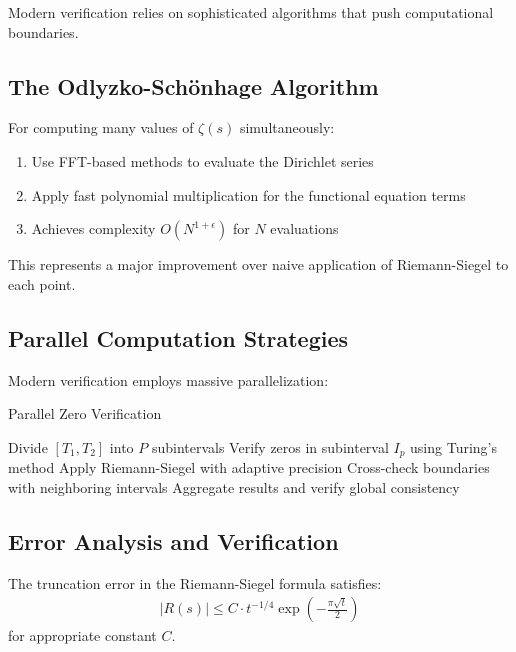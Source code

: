 Modern verification relies on sophisticated algorithms that push computational boundaries.

\subsection{The Odlyzko-Schönhage Algorithm}

\begin{theorem}
For computing many values of $\zeta(s)$ simultaneously:
\begin{enumerate}
\item Use FFT-based methods to evaluate the Dirichlet series
\item Apply fast polynomial multiplication for the functional equation terms
\item Achieves complexity $O(N^{1+\epsilon})$ for $N$ evaluations
\end{enumerate}
\end{theorem}

This represents a major improvement over naive application of Riemann-Siegel to each point.

\subsection{Parallel Computation Strategies}

Modern verification employs massive parallelization:

\begin{algorithm}[H]
\caption{Parallel Zero Verification}
\begin{algorithmic}
\State Divide $[T_1, T_2]$ into $P$ subintervals
    \State Verify zeros in subinterval $I_p$ using Turing's method
    \State Apply Riemann-Siegel with adaptive precision
    \State Cross-check boundaries with neighboring intervals
\EndFor
\State Aggregate results and verify global consistency
\end{algorithmic}
\end{algorithm}

\subsection{Error Analysis and Verification}

\begin{theorem}
The truncation error in the Riemann-Siegel formula satisfies:
\begin{align}
|R(s)| \leq C \cdot t^{-1/4} \exp\left(-\frac{\pi\sqrt{t}}{2}\right)
\end{align}
for appropriate constant $C$.
\end{theorem}

